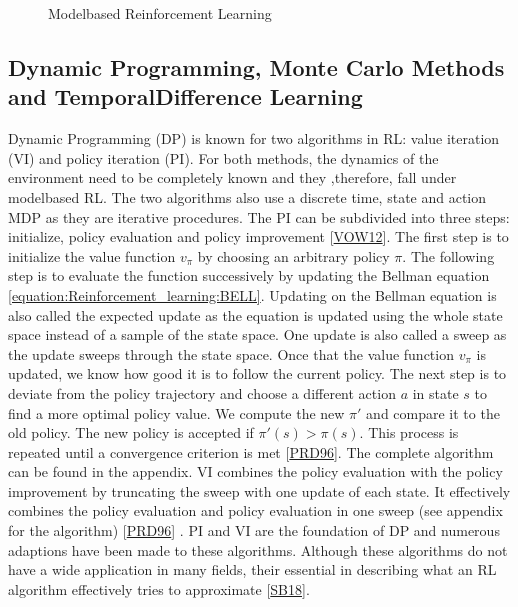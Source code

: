 \documentclass[letterpaper,10pt,english]{jupyterBook}
\let\sphinxpxdimen\pdfpxdimen\else\newdimen\sphinxpxdimen
\begin{document}
\begin{figure}[htbp]
\centering
\capstart

\noindent\sphinxincludegraphics[width=300\sphinxpxdimen,height=200\sphinxpxdimen]{{model_based_RL}.png}
\caption{Model\sphinxhyphen{}based Reinforcement Learning}\label{\detokenize{Reinforcement_learning:model-based-rl}}\end{figure}


\subsection{Dynamic Programming, Monte Carlo Methods and Temporal\sphinxhyphen{}Difference Learning}
\label{\detokenize{Reinforcement_learning:dynamic-programming-monte-carlo-methods-and-temporal-difference-learning}}
\sphinxAtStartPar
Dynamic Programming (DP) is known for two algorithms in RL: value iteration (VI) and policy iteration (PI). For both methods, the dynamics of the environment need to be completely known and they ,therefore, fall under model\sphinxhyphen{}based RL. The two algorithms also use a discrete time, state and action MDP as they are iterative procedures. The PI can be subdivided into three steps: initialize, policy evaluation and policy improvement {[}\hyperlink{cite.Discussion:id42}{VOW12}{]}. The first step is to initialize the value function \(v_{\pi}\) by choosing an arbitrary policy \(\pi\). The following step is to evaluate the function successively by updating the Bellman equation \eqref{equation:Reinforcement_learning:BELL}. Updating on the Bellman equation is also called the expected update as the equation is updated using the whole state space instead of a sample of the state space. One update is also called a sweep as the update sweeps through the state space. Once that the value function \(v_{\pi}\) is updated, we know how good it is to follow the current policy. The next step is to deviate from the policy trajectory and choose a different action \(a\) in state \(s\) to find a more optimal policy value. We compute the new \(\pi '\) and compare it to the old policy. The new policy is accepted if \(\pi '(s) > \pi(s)\). This process is repeated until a convergence criterion is met {[}\hyperlink{cite.Discussion:id41}{PRD96}{]}. The complete algorithm can be found in the appendix. VI combines the policy evaluation with the policy improvement by truncating the sweep with one update of each state. It effectively combines the policy evaluation and policy evaluation in one sweep (see appendix for the algorithm) {[}\hyperlink{cite.Discussion:id41}{PRD96}{]} . PI and VI are the foundation of DP and numerous adaptions have been made to these algorithms. Although these algorithms do not have a wide application in many fields, their essential in describing what an RL algorithm effectively tries to approximate {[}\hyperlink{cite.Discussion:id70}{SB18}{]}.
\end{document}
